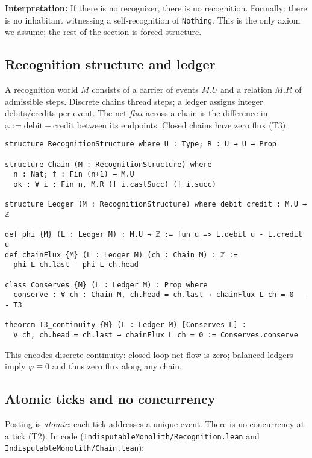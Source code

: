 \documentclass[11pt,a4paper,twoside]{article}
\numberwithin{equation}{section}
\renewcommand{\phi}{\varphi}
\theoremstyle{customthm}
\theoremstyle{customdef}
\theoremstyle{customrem}
\begin{document}
\noindent\textbf{Interpretation:} If there is no recognizer, there is no recognition. Formally: there is no inhabitant witnessing a self-recognition of \texttt{Nothing}. This is the only axiom we assume; the rest of the section is forced structure.

\subsection{Recognition structure and ledger}

A recognition world $M$ consists of a carrier of events $M.U$ and a relation $M.R$ of admissible steps. Discrete chains thread steps; a ledger assigns integer debits/credits per event. The net \emph{flux} across a chain is the difference in $\phi:=\mathrm{debit}-\mathrm{credit}$ between its endpoints. Closed chains have zero flux (T3).

\begin{lstlisting}
structure RecognitionStructure where U : Type; R : U → U → Prop

structure Chain (M : RecognitionStructure) where
  n : Nat; f : Fin (n+1) → M.U
  ok : ∀ i : Fin n, M.R (f i.castSucc) (f i.succ)

structure Ledger (M : RecognitionStructure) where debit credit : M.U → ℤ

def phi {M} (L : Ledger M) : M.U → ℤ := fun u => L.debit u - L.credit u
def chainFlux {M} (L : Ledger M) (ch : Chain M) : ℤ :=
  phi L ch.last - phi L ch.head

class Conserves {M} (L : Ledger M) : Prop where
  conserve : ∀ ch : Chain M, ch.head = ch.last → chainFlux L ch = 0  -- T3

theorem T3_continuity {M} (L : Ledger M) [Conserves L] :
  ∀ ch, ch.head = ch.last → chainFlux L ch = 0 := Conserves.conserve
\end{lstlisting}

This encodes discrete continuity: closed-loop net flow is zero; balanced ledgers imply $\phi\equiv 0$ and thus zero flux along any chain.

\subsection{Atomic ticks and no concurrency}

Posting is \emph{atomic}: each tick addresses a unique event. There is no concurrency at a tick (T2). In code (\texttt{IndisputableMonolith/Recognition.lean} and \texttt{IndisputableMonolith/Chain.lean}):
\end{document}

